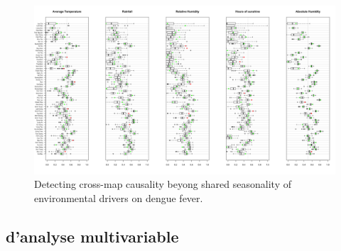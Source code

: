\begin{figure}[h]
\begin{center}
\includegraphics[width = \linewidth]{../figures/chap6/ccm_result1_100sur.png}
\caption{Detecting cross-map causality beyong shared seasonality of environmental drivers on dengue fever.}
\label{Resultccm1}	
\end{center}
\end{figure}

\subsection{\Rs d'analyse multivariable}

